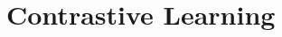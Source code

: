 \documentclass[a4paper, oneside, english]{sapthesis} %
\begin{document}

\section{Contrastive Learning}
\end{document}
